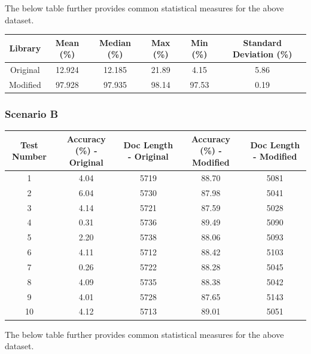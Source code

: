 \documentclass[9pt, titlepage]{article}
\begin{document}
  The below table further provides common statistical measures for the above dataset.\\

  \begin{center}
    \begin{tabular}{||c c c c c c||} 
      \hline
      Library & Mean (\%) & Median (\%) & Max (\%) & Min (\%) & Standard Deviation (\%) \\ [0.5ex] 
      \hline\hline
      Original & 12.924 & 12.185 & 21.89 & 4.15 & 5.86 \\ 
      \hline
      Modified & 97.928 & 97.935 & 98.14 & 97.53 & 0.19 \\
      \hline
    \end{tabular}
  \end{center}
  \hfill

  \subsubsection{Scenario B}
  
  \begin{center}
    \begin{tabular}{||c c c c c||} 
      \hline
      Test Number & Accuracy (\%) - Original & Doc Length - Original & Accuracy (\%) - Modified & Doc Length - Modified \\ [0.5ex] 
      \hline\hline
      1 &  4.04 & 5719 & 88.70 & 5081 \\ 
      \hline
      2 &  6.04 & 5730 & 87.98 & 5041 \\ 
      \hline
      3 &  4.14 & 5721 & 87.59 & 5028 \\ 
      \hline
      4 &  0.31 & 5736 & 89.49 & 5090 \\ 
      \hline
      5 &  2.20 & 5738 & 88.06 & 5093 \\ 
      \hline
      6 &  4.11 & 5712 & 88.42 & 5103 \\ 
      \hline
      7 &  0.26 & 5722 & 88.28 & 5045 \\ 
      \hline
      8 &  4.09 & 5735 & 88.38 & 5042 \\ 
      \hline
      9 &  4.01 & 5728 & 87.65 & 5143 \\ 
      \hline
      10 & 4.12 & 5713 & 89.01 & 5051 \\ 
      \hline
    \end{tabular}
  \end{center}
  
  The below table further provides common statistical measures for the above dataset.\\
\end{document}
